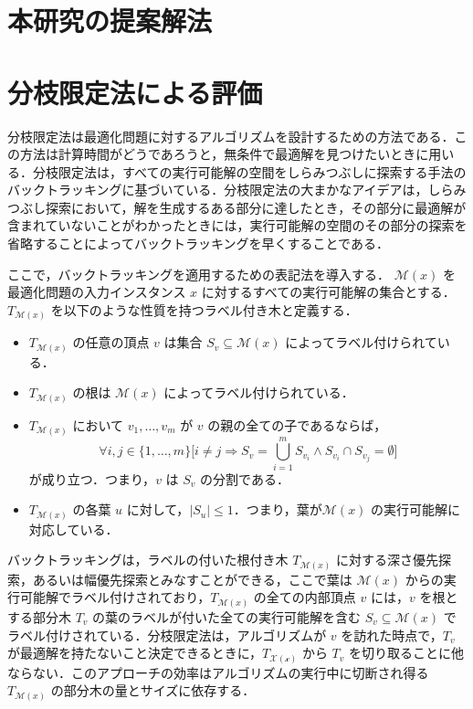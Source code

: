 \documentclass[12pt]{optlab-bachelor}
\begin{document}
\section{本研究の提案解法}
\section{分枝限定法による評価}
分枝限定法は最適化問題に対するアルゴリズムを設計するための方法である．この方法は計算時間がどうであろうと，無条件で最適解を見つけたいときに用いる．分枝限定法は，すべての実行可能解の空間をしらみつぶしに探索する手法のバックトラッキングに基づいている．分枝限定法の大まかなアイデアは，しらみつぶし探索において，解を生成するある部分に達したとき，その部分に最適解が含まれていないことがわかったときには，実行可能解の空間のその部分の探索を省略することによってバックトラッキングを早くすることである．

ここで，バックトラッキングを適用するための表記法を導入する．
$\mathcal{M}(x)$ を最適化問題の入力インスタンス $x$ に対するすべての実行可能解の集合とする．$T_{\mathcal{M}(x)}$ を以下のような性質を持つラベル付き木と定義する．
\begin{itemize}
  \item $T_{\mathcal{M}(x)}$ の任意の頂点 $v$ は集合 $S_v \subseteq \mathcal{M}(x)$ によってラベル付けられている．
  \item $T_{\mathcal{M}(x)}$ の根は $\mathcal{M}(x)$ によってラベル付けられている．
  \item $T_{\mathcal{M}(x)}$ において $v_1,\ldots,v_m$ が $v$ の親の全ての子であるならば，$$\forall i,j \in \{1,\ldots,m\}\bigg[i \neq j \Rightarrow S_v = \bigcup_{i = 1}^{m}S_{v_i} \land S_{v_i} \cap S_{v_j} = \emptyset \bigg]$$ が成り立つ．つまり，$v$ は $S_v$ の分割である．
  \item $T_{\mathcal{M}(x)}$ の各葉 $u$ に対して，$|S_u| \le 1$．つまり，葉が$\mathcal{M}(x)$ の実行可能解に対応している．
\end{itemize}

バックトラッキングは，ラベルの付いた根付き木 $T_{\mathcal{M}(x)}$ に対する深さ優先探索，あるいは幅優先探索とみなすことができる，ここで葉は $\mathcal{M}(x)$ からの実行可能解でラベル付けされており，$T_{\mathcal{M}(x)}$ の全ての内部頂点 $v$ には，$v$ を根とする部分木 $T_v$ の葉のラベルが付いた全ての実行可能解を含む $S_v \subseteq \mathcal{M}(x)$ でラベル付けされている．分枝限定法は，アルゴリズムが $v$ を訪れた時点で，$T_v$ が最適解を持たないこと決定できるときに，$T_{\mathcal{X(x)}}$ から $T_v$ を切り取ることに他ならない．このアプローチの効率はアルゴリズムの実行中に切断され得る $T_{\mathcal{M}(x)}$ の部分木の量とサイズに依存する．
\end{document}
